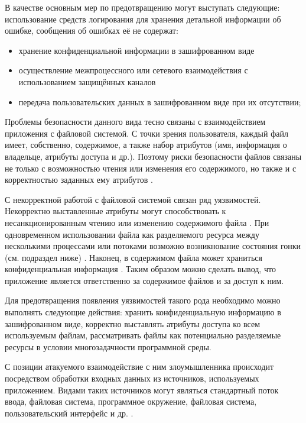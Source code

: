 %
В качестве основным мер по предотвращению могут выступать следующие:
использование средств логирования для хранения детальной информации об ошибке, сообщения об ошибках 
её не содержат:
\begin{itemize}
	\item хранение конфиденциальной информации в зашифрованном виде
	\item осуществление межпроцессного или сетевого взаимодействия с использованием защищённых 
		каналов
	\item передача пользовательских данных в зашифрованном виде при их отсутствии;
\end{itemize}


%
Проблемы безопасности данного вида тесно связаны с взаимодействием приложения с файловой системой. 
%
С точки зрения пользователя, каждый файл имеет, собственно, содержимое, а также набор атрибутов 
(имя, информация о владельце, атрибуты доступа и др.). 
%
Поэтому риски безопасности файлов связаны не только с возможностью чтения или изменения его 
содержимого, но также и с корректностью заданных ему атрибутов .

%
С некорректной работой с файловой системой связан ряд уязвимостей. 
%
Некорректно выставленные атрибуты могут способствовать к несанкционированным чтению или изменению 
содержимого файла . 
%
При одновременном использовании файла как разделяемого ресурса между несколькими процессами или 
потоками возможно возникнование состояния гонки (см. подраздел ниже) . 
%
Наконец, в содержимом файла может храниться конфиденциальная информация . 
%
Таким образом можно сделать вывод, что приложение является ответственно за содержимое файлов 
и за доступ к ним.

%
Для предотвращения появления уязвимостей такого рода необходимо можно выполнять следующие действия: 
хранить конфиденциальную информацию в зашифрованном виде, корректно выставлять атрибуты доступа 
ко всем используемым файлам, рассматривать файлы как потенциально разделяемые ресурсы в условии 
многозадачности программной среды.


%
С позиции атакуемого  взаимодействие с ним злоумышленника происходит 
посредством обработки входных данных из источников, используемых приложением. 
%
Видами таких источников могут являться стандартный поток ввода, файловая система, программное 
окружение, файловая система, пользовательский интерфейс и др. . 

